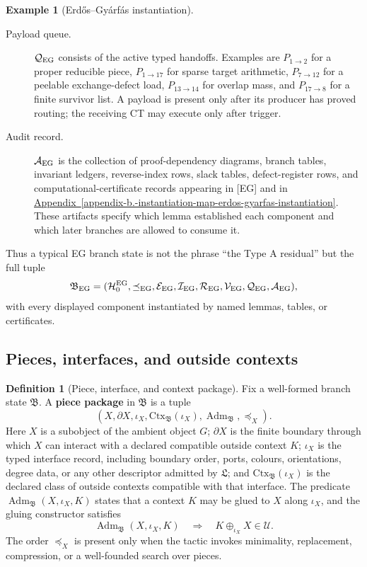 \documentclass[
  11pt,
]{article}
\theoremstyle{definition}
\newtheorem{definition}{Definition}[section]
\newtheorem{example}{Example}[section]
\newcommand{\appref}[1]{\hyperref[#1]{Appendix~\ref*{#1}}}
\begin{document}
\begin{example}[Erdős--Gyárfás instantiation]
\begin{description}
\item[Payload queue.]
\(\mathcal Q_{\rm EG}\) consists of the active typed handoffs.  Examples
are \(P_{1\to2}\) for a proper reducible piece, \(P_{1\to17}\) for sparse
target arithmetic, \(P_{7\to12}\) for a peelable exchange-defect load,
\(P_{13\to14}\) for overlap mass, and \(P_{17\to8}\) for a finite
survivor list.  A payload is present only after its producer has proved
routing; the receiving CT may execute only after trigger.

\item[Audit record.]
\(\mathcal A_{\rm EG}\) is the collection of proof-dependency diagrams,
branch tables, invariant ledgers, reverse-index rows, slack tables,
defect-register rows, and computational-certificate records appearing in
{[}EG{]} and in \appref{appendix-b.-instantiation-map-erdos-gyarfas-instantiation}.  These
artifacts specify which lemma established each component and which later
branches are allowed to consume it.
\end{description}

Thus a typical EG branch state is not the phrase ``the Type A residual''
but the full tuple
\[
\mathfrak B_{\rm EG}
=
(\mathcal H^{\rm EG}_0,\preceq_{\rm EG},\mathcal E_{\rm EG},
 \mathcal I_{\rm EG},\mathcal R_{\rm EG},
 \mathcal V_{\rm EG},\mathcal Q_{\rm EG},\mathcal A_{\rm EG}),
\]
with every displayed component instantiated by named lemmas, tables, or
certificates.
\end{example}

\subsection{Pieces, interfaces, and outside contexts}\label{data-pieces-interfaces}
\begin{definition}[Piece, interface, and context package]\label{def:piece-interface-context}
Fix a well-formed branch state \(\mathfrak B\).  A \textbf{piece
package} in \(\mathfrak B\) is a tuple
\[
(X,\partial X,\iota_X,\mathrm{Ctx}_{\mathfrak B}(\iota_X),
  \operatorname{Adm}_{\mathfrak B},\preceq_X).
\]
Here \(X\) is a subobject of the ambient object \(G\); \(\partial X\) is
the finite boundary through which \(X\) can interact with a declared
compatible outside context \(K\);
\(\iota_X\) is the typed interface record, including boundary order,
ports, colours, orientations, degree data, or any other descriptor
admitted by \(\mathfrak L\); and
\(\mathrm{Ctx}_{\mathfrak B}(\iota_X)\) is the declared class of outside
contexts compatible with that interface.  The predicate
\(\operatorname{Adm}_{\mathfrak B}(X,\iota_X,K)\) states that a context
\(K\) may be glued to \(X\) along \(\iota_X\), and the gluing constructor
satisfies
\[
\operatorname{Adm}_{\mathfrak B}(X,\iota_X,K)
\quad\Longrightarrow\quad
K\oplus_{\iota_X}X\in\mathcal U.
\]
The order
\(\preceq_X\) is present only when the tactic invokes minimality,
replacement, compression, or a well-founded search over pieces.
\end{definition}
\end{document}
